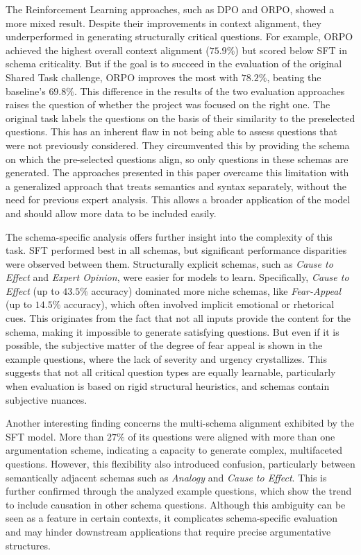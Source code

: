 \documentclass[11pt]{article}
\begin{document}
The Reinforcement Learning approaches, such as DPO and ORPO, showed a more mixed result. Despite their improvements in context alignment, they underperformed in generating structurally critical questions.
For example, ORPO achieved the highest overall context alignment ($75.9\%$) but scored below SFT in schema criticality. But if the goal is to succeed in the evaluation of the original Shared Task challenge, ORPO improves the most with $78.2\%$, beating the baseline's $69.8\%$. This difference in the results of the two evaluation approaches raises the question of whether the project was focused on the right one. The original task labels the questions on the basis of their similarity to the preselected questions. This has an inherent flaw in not being able to assess questions that were not previously considered. They circumvented this by providing the schema on which the pre-selected questions align, so only questions in these schemas are generated. The approaches presented in this paper overcame this limitation with a generalized approach that treats semantics and syntax separately, without the need for previous expert analysis. This allows a broader application of the model and should allow more data to be included easily.

The schema-specific analysis offers further insight into the complexity of this task. SFT performed best in all schemas, but significant performance disparities were observed between them. Structurally explicit schemas, such as \textit{Cause to Effect} and \textit{Expert Opinion}, were easier for models to learn. Specifically, \textit{Cause to Effect} (up to $43.5\%$ accuracy) dominated more niche schemas, like \textit{Fear-Appeal} (up to $14.5\%$ accuracy), which often involved implicit emotional or rhetorical cues. This originates from the fact that not all inputs provide the content for the schema, making it impossible to generate satisfying questions. But even if it is possible, the subjective matter of the degree of fear appeal is shown in the example questions, where the lack of severity and urgency crystallizes. This suggests that not all critical question types are equally learnable, particularly when evaluation is based on rigid structural heuristics, and schemas contain subjective nuances.

Another interesting finding concerns the multi-schema alignment exhibited by the SFT model. More than $27\%$ of its questions were aligned with more than one argumentation scheme, indicating a capacity to generate complex, multifaceted questions. However, this flexibility also introduced confusion, particularly between semantically adjacent schemas such as \textit{Analogy} and \textit{Cause to Effect}. This is further confirmed through the analyzed example questions, which show the trend to include causation in other schema questions. Although this ambiguity can be seen as a feature in certain contexts, it complicates schema-specific evaluation and may hinder downstream applications that require precise argumentative structures.
\end{document}
